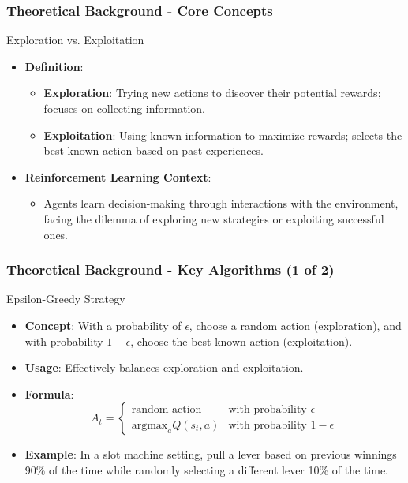 \documentclass[aspectratio=169]{beamer}
\begin{document}
\begin{frame}[fragile]
    \frametitle{Theoretical Background - Core Concepts}
    \begin{block}{Exploration vs. Exploitation}
        \begin{itemize}
            \item \textbf{Definition}:
            \begin{itemize}
                \item \textbf{Exploration}: Trying new actions to discover their potential rewards; focuses on collecting information.
                \item \textbf{Exploitation}: Using known information to maximize rewards; selects the best-known action based on past experiences.
            \end{itemize}
            \item \textbf{Reinforcement Learning Context}:
            \begin{itemize}
                \item Agents learn decision-making through interactions with the environment, facing the dilemma of exploring new strategies or exploiting successful ones.
            \end{itemize}
        \end{itemize}
    \end{block}
\end{frame}

\begin{frame}[fragile]
    \frametitle{Theoretical Background - Key Algorithms (1 of 2)}
    \begin{block}{Epsilon-Greedy Strategy}
        \begin{itemize}
            \item \textbf{Concept}: With a probability of $\epsilon$, choose a random action (exploration), and with probability $1 - \epsilon$, choose the best-known action (exploitation).
            \item \textbf{Usage}: Effectively balances exploration and exploitation.
            \item \textbf{Formula}:
            \begin{equation}
            A_t = \begin{cases} 
            \text{random action} & \text{with probability } \epsilon \\ 
            \text{argmax}_a Q(s_t, a) & \text{with probability } 1 - \epsilon 
            \end{cases}
            \end{equation}
            \item \textbf{Example}: In a slot machine setting, pull a lever based on previous winnings 90\% of the time while randomly selecting a different lever 10\% of the time.
        \end{itemize}
    \end{block}
\end{frame}
\end{document}
